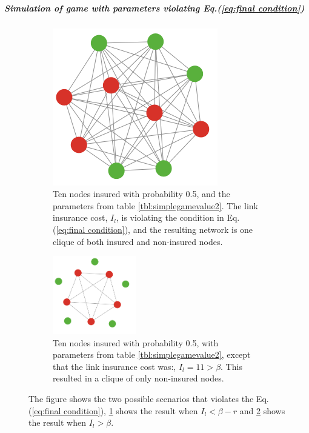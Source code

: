\subparagraph{Simulation of game with parameters violating Eq.(\ref{eq:final condition})}
\begin{figure}[h]
\centering
\begin{subfigure}{.5\textwidth}
  \centering
\includegraphics[width=0.4\linewidth]{../Figures/FirstSimulationViolatingResult.png}

\caption{\label{fig:SimulationViolatingA} Ten nodes insured with probability 0.5, and the parameters from table \ref{tbl:simplegamevalue2}. The link insurance cost, $I_{l}$, is violating the condition in Eq.(\ref{eq:final condition}), and the resulting network is one clique of both insured and non-insured nodes.}
\end{subfigure}
\quad
\begin{subfigure}{0.46\textwidth}
\centering
\includegraphics[width=0.4\textwidth]{../Figures/SimulationViolating2.png}

\caption{\label{fig:SimulationViolatingB} Ten nodes insured with probability 0.5, with parameters from table \ref{tbl:simplegamevalue2}, except that the link insurance cost was:, $I_{l}=11>\beta$. This resulted in a clique of only non-insured nodes. }
\end{subfigure}
\caption{\label{fig:SimulationViolating} The figure shows the two possible scenarios that violates the Eq.(\ref{eq:final condition}), \ref{fig:SimulationViolatingA} shows the result when $I_{l}<\beta-r$ and \ref{fig:SimulationViolatingB} shows the result when $I_{l}>\beta$.}
\end{figure}

